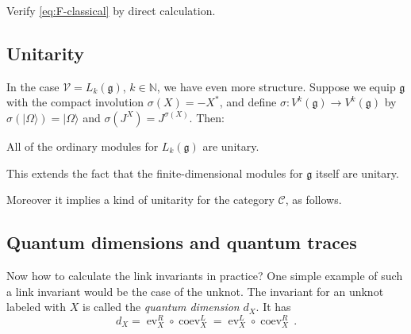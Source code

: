 \documentclass[12pt,letterpaper,reqno]{amsart}
\numberwithin{equation}{section}
\newcommand{\fg}{{\mathfrak g}}
\newcommand{\fsl}{{\mathfrak {sl}}}
\newcommand{\cC}{\ensuremath{\mathcal C}}
\newcommand{\cM}{\ensuremath{\mathcal M}}
\newcommand{\bbN}{{\mathbb N}}
\newcommand{\I}{{\mathrm i}}
\newcommand\vac{{|\Omega\rangle}}
\newcommand{\vertex}{\mathcal{V}}
\newcommand{\ti}[1]{\textit{#1}}
\DeclareMathOperator{\ev}{ev}
\DeclareMathOperator{\coev}{coev}
\DeclareRobustCommand{\fixme}[1]{\leavevmode{\color{orange}[#1]}}
\begin{document}
\begin{example}




\end{example}


\begin{exercise}
Verify \eqref{eq:F-classical} by direct calculation.
\end{exercise}


\subsection{Unitarity}

In the case $\vertex = L_k(\fg)$, $k \in \bbN$, we have even more structure.
Suppose we equip $\fg$ with the compact involution $\sigma(X) = - X^*$,
and define $\sigma: V^k(\fg) \to V^k(\fg)$ by
$\sigma(\vac) = \vac$
and $\sigma(J^X) = J^{\sigma(X)}$.
Then:
\begin{prop}
All of the ordinary modules for $L_k(\fg)$ are unitary.
\end{prop}
This extends the fact that the finite-dimensional modules for 
$\fg$ itself are unitary.

Moreover it implies a kind of unitarity for the category $\cC$,
as follows. \fixme{...}


\subsection{Quantum dimensions and quantum traces}

Now how to calculate the link invariants in practice?
One simple example of such a link invariant would be the case of the unknot.
The invariant for an unknot labeled with $X$ is 
called the \ti{quantum dimension} $d_X$. It has
\begin{equation}
  d_X = \ev_X^R \circ \coev_X^L = \ev_X^L \circ \coev_X^R \, .
\end{equation}
\end{document}
